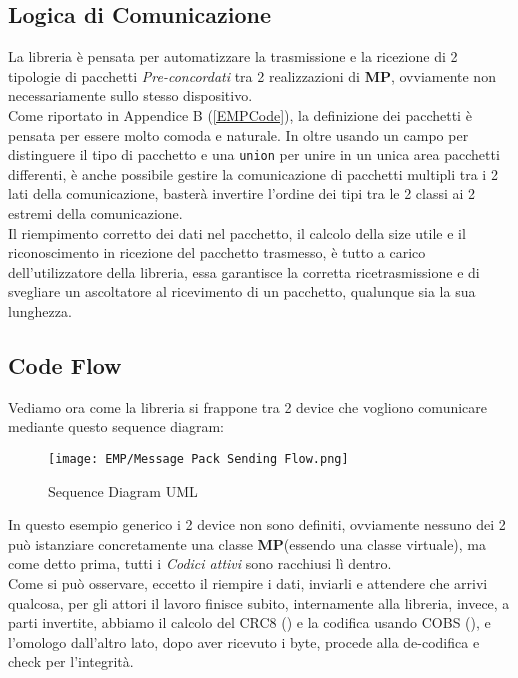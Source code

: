\subsection{Logica di Comunicazione}
\vspace{-5mm}
La libreria è pensata per automatizzare la trasmissione e la ricezione di 2 tipologie di pacchetti \textit{Pre-concordati} tra 2 realizzazioni di \textbf{MP}, ovviamente non necessariamente sullo stesso dispositivo.\\
Come riportato in Appendice B (\ref{EMPCode}), la definizione dei pacchetti è pensata per essere molto comoda e naturale. In oltre usando un campo per distinguere il tipo di pacchetto e una \verb|union| per unire in un unica area pacchetti differenti, è anche possibile gestire la comunicazione di pacchetti multipli tra i 2 lati della comunicazione, basterà invertire l'ordine dei tipi tra le 2 classi ai 2 estremi della comunicazione.\\
Il riempimento corretto dei dati nel pacchetto, il calcolo della size utile e il riconoscimento in ricezione del pacchetto trasmesso, è tutto a carico dell'utilizzatore della libreria, essa garantisce la corretta ricetrasmissione e di svegliare un ascoltatore al ricevimento di un pacchetto, qualunque sia la sua lunghezza.


\newpage
\subsection{Code Flow}\label{sub:codeFlow}
Vediamo ora come la libreria si frappone tra 2 device che vogliono comunicare mediante questo sequence diagram:\\
\begin{figure}[h]
	\centering
	\texttt{[image: EMP/Message Pack Sending Flow.png]}
	\caption[Sequence Diagram UML di EMP]{Sequence Diagram UML}
\end{figure}

\noindent
In questo esempio generico i 2 device non sono definiti, ovviamente nessuno dei 2 può istanziare concretamente una classe \textbf{MP}(essendo una classe virtuale), ma come detto prima, tutti i \textit{Codici attivi} sono racchiusi lì dentro.\\
Come si può osservare, eccetto il riempire i dati, inviarli e attendere che arrivi qualcosa, per gli attori il lavoro finisce subito, internamente alla libreria, invece, a parti invertite, abbiamo il calcolo del CRC8 (\cite{CRC8}) e la codifica usando COBS (\cite{COBS}), e l'omologo dall'altro lato, dopo aver ricevuto i byte, procede alla de-codifica e check per l'integrità.\\

